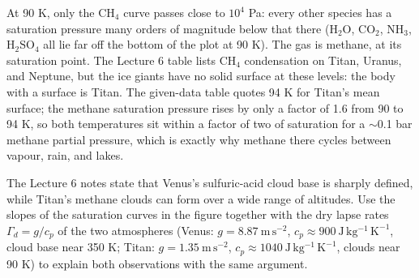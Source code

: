 \begin{solution}
At 90 K, only the $\mathrm{CH_4}$ curve passes close to $10^4$ Pa: every other species has a saturation
pressure many orders of magnitude below that there ($\mathrm{H_2O}$, $\mathrm{CO_2}$, $\mathrm{NH_3}$,
$\mathrm{H_2SO_4}$ all lie far off the bottom of the plot at 90 K).
The gas is methane, at its saturation point.
The Lecture 6 table lists $\mathrm{CH_4}$ condensation on Titan, Uranus, and Neptune, but the ice giants
have no solid surface at these levels: the body with a surface is Titan.
The given-data table quotes 94 K for Titan's mean surface; the methane saturation pressure rises by only a factor of 1.6 from 90 to
94 K, so both temperatures sit within a factor of two of saturation for a $\sim$0.1 bar methane partial pressure, which is
exactly why methane there cycles between vapour, rain, and lakes.
\end{solution}

\parti The Lecture 6 notes state that Venus's sulfuric-acid cloud base is sharply defined, while Titan's
methane clouds can form over a wide range of altitudes. Use the slopes of the saturation curves in the
figure together with the dry lapse rates $\Gamma_d = g/c_p$ of the two atmospheres (Venus: $g = 8.87\ \mathrm{m\,s^{-2}}$,
$c_p \approx 900\ \mathrm{J\,kg^{-1}\,K^{-1}}$, cloud base near 350 K; Titan: $g = 1.35\ \mathrm{m\,s^{-2}}$,
$c_p \approx 1040\ \mathrm{J\,kg^{-1}\,K^{-1}}$, clouds near 90 K) to explain both observations with the same argument.

